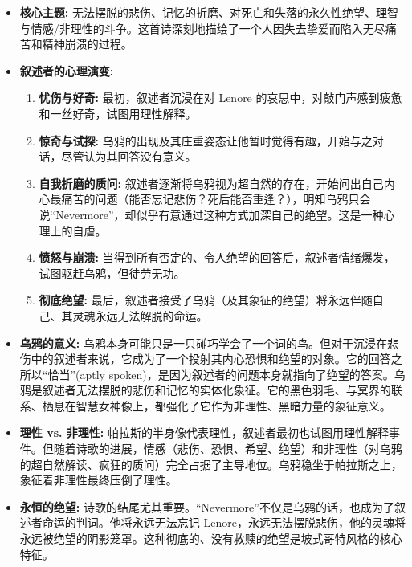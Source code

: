 \documentclass[12pt, a4paper]{article}
\begin{document}
\begin{itemize}
    \item \textbf{核心主题:} 无法摆脱的悲伤、记忆的折磨、对死亡和失落的永久性绝望、理智与情感/非理性的斗争。这首诗深刻地描绘了一个人因失去挚爱而陷入无尽痛苦和精神崩溃的过程。
    \item \textbf{叙述者的心理演变:}
        \begin{enumerate}
            \item \textbf{忧伤与好奇:} 最初，叙述者沉浸在对 Lenore 的哀思中，对敲门声感到疲惫和一丝好奇，试图用理性解释。
            \item \textbf{惊奇与试探:} 乌鸦的出现及其庄重姿态让他暂时觉得有趣，开始与之对话，尽管认为其回答没有意义。
            \item \textbf{自我折磨的质问:} 叙述者逐渐将乌鸦视为超自然的存在，开始问出自己内心最痛苦的问题（能否忘记悲伤？死后能否重逢？），明知乌鸦只会说“Nevermore”，却似乎有意通过这种方式加深自己的绝望。这是一种心理上的自虐。
            \item \textbf{愤怒与崩溃:} 当得到所有否定的、令人绝望的回答后，叙述者情绪爆发，试图驱赶乌鸦，但徒劳无功。
            \item \textbf{彻底绝望:} 最后，叙述者接受了乌鸦（及其象征的绝望）将永远伴随自己、其灵魂永远无法解脱的命运。
        \end{enumerate}
    \item \textbf{乌鸦的意义:} 乌鸦本身可能只是一只碰巧学会了一个词的鸟。但对于沉浸在悲伤中的叙述者来说，它成为了一个投射其内心恐惧和绝望的对象。它的回答之所以“恰当”(aptly spoken)，是因为叙述者的问题本身就指向了绝望的答案。乌鸦是叙述者无法摆脱的悲伤和记忆的实体化象征。它的黑色羽毛、与冥界的联系、栖息在智慧女神像上，都强化了它作为非理性、黑暗力量的象征意义。
    \item \textbf{理性 vs. 非理性:} 帕拉斯的半身像代表理性，叙述者最初也试图用理性解释事件。但随着诗歌的进展，情感（悲伤、恐惧、希望、绝望）和非理性（对乌鸦的超自然解读、疯狂的质问）完全占据了主导地位。乌鸦稳坐于帕拉斯之上，象征着非理性最终压倒了理性。
    \item \textbf{永恒的绝望:} 诗歌的结尾尤其重要。“Nevermore”不仅是乌鸦的话，也成为了叙述者命运的判词。他将永远无法忘记 Lenore，永远无法摆脱悲伤，他的灵魂将永远被绝望的阴影笼罩。这种彻底的、没有救赎的绝望是坡式哥特风格的核心特征。
\end{itemize}
\end{document}
